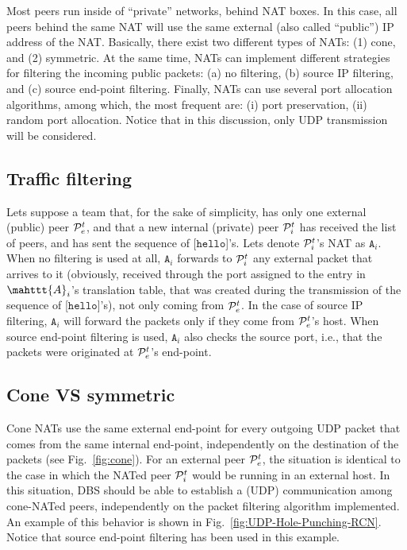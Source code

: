 
Most peers run inside of ``private'' networks, behind NAT boxes. In
this case, all peers behind the same NAT will use the same external
(also called ``public'') IP address of the NAT. Basically, there exist
two different types of NATs: (1) cone, and (2) symmetric. At the same
time, NATs can implement different strategies for filtering the
incoming public packets: (a) no filtering, (b) source IP filtering,
and (c) source end-point filtering. Finally, NATs can use several port
allocation algorithms, among which, the most frequent are: (i) port
preservation, (ii) random port allocation. Notice that in this
discussion, only UDP transmission will be considered.

\subsection{Traffic filtering}
Lets suppose a team that, for the sake of simplicity, has only one
external (public) peer ${\cal P}^t_e$, and that a new internal
(private) peer ${\cal P}^t_i$ has received the list of peers, and has
sent the sequence of [$\mathtt{hello}$]'s. Lets denote ${\cal
  P}^t_i$'s NAT as $\mathtt{A}_i$. When no filtering is used at all,
$\mathtt{A}_i$ forwards to ${\cal P}^t_i$ any external packet that
arrives to it (obviously, received through the port assigned to the
entry in $\mahttt{A}_i$'s translation table, that was created during
the transmission of the sequence of [$\mathtt{hello}$]'s), not only
coming from ${\cal P}^t_e$. In the case of source IP filtering,
$\mathtt{A}_i$ will forward the packets only if they come from ${\cal
  P}^t_e$'s host.  When source end-point filtering is used,
$\mathtt{A}_i$ also checks the source port, i.e., that the packets
were originated at ${\cal P}^t_e$'s end-point.

\subsection{Cone VS symmetric}
Cone NATs use the same external end-point for every outgoing UDP
packet that comes from the same internal end-point, independently on
the destination of the packets (see Fig.~\ref{fig:cone}). For an
external peer ${\cal P}^t_e$, the situation is identical to the case
in which the NATed peer ${\cal P}^t_i$ would be running in an external
host. In this situation, DBS should be able to establish a (UDP)
communication among cone-NATed peers, independently on the packet
filtering algorithm implemented. An example of this behavior is shown
in Fig.~\ref{fig:UDP-Hole-Punching-RCN}. Notice that source end-point
filtering has been used in this example.

